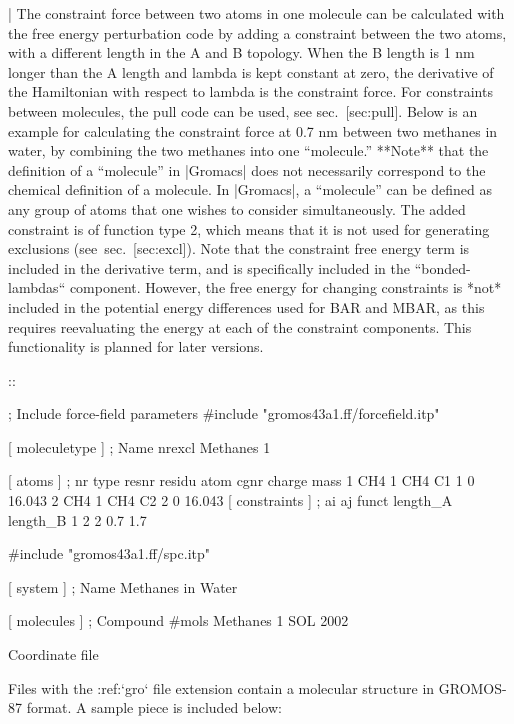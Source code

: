 | The constraint force between two atoms in one molecule can be
  calculated with the free energy perturbation code by adding a
  constraint between the two atoms, with a different length in the A and
  B topology. When the B length is 1 nm longer than the A length and
  lambda is kept constant at zero, the derivative of the Hamiltonian
  with respect to lambda is the constraint force. For constraints
  between molecules, the pull code can be used, see sec. [sec:pull].
  Below is an example for calculating the constraint force at 0.7 nm
  between two methanes in water, by combining the two methanes into one
  “molecule.” **Note** that the definition of a “molecule” in |Gromacs|
  does not necessarily correspond to the chemical definition of a
  molecule. In |Gromacs|, a “molecule” can be defined as any group of
  atoms that one wishes to consider simultaneously. The added constraint
  is of function type 2, which means that it is not used for generating
  exclusions (see sec. [sec:excl]). Note that the constraint free energy
  term is included in the derivative term, and is specifically included
  in the ``bonded-lambdas`` component. However, the free energy for changing
  constraints is *not* included in the potential energy differences used
  for BAR and MBAR, as this requires reevaluating the energy at each of
  the constraint components. This functionality is planned for later
  versions.

::

    ; Include force-field parameters
    #include "gromos43a1.ff/forcefield.itp"

    [ moleculetype ]
    ; Name            nrexcl
    Methanes               1

    [ atoms ]
    ; nr   type   resnr  residu   atom    cgnr     charge    mass
       1    CH4     1     CH4      C1       1          0    16.043
       2    CH4     1     CH4      C2       2          0    16.043
    [ constraints ]
    ;  ai    aj funct   length_A  length_B
        1     2     2        0.7       1.7

    #include "gromos43a1.ff/spc.itp"

    [ system ]
    ; Name
    Methanes in Water

    [ molecules ]
    ; Compound        #mols
    Methanes              1
    SOL                2002

Coordinate file
~~~~~~~~~~~~~~~

Files with the :ref:`gro` file extension contain a molecular
structure in GROMOS-87 format. A sample piece is included below:

